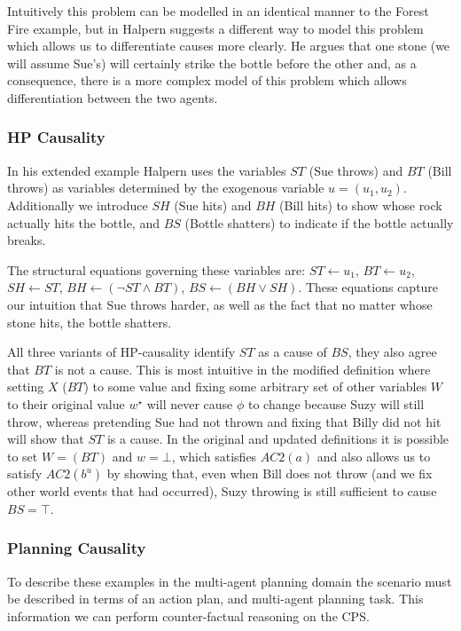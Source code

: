 \documentclass{article}
\theoremstyle{plain}
\theoremstyle{definition}
\begin{document}
Intuitively this problem can be modelled in an identical manner to the Forest Fire example, but in \cite{halpern2005causes} Halpern suggests a different way to model this problem which allows us to differentiate causes more clearly. He argues that one stone (we will assume Sue's) will certainly strike the bottle before the other and, as a consequence, there is a more complex model of this problem which allows differentiation between the two agents.



\subsubsection*{HP Causality}
In his extended example Halpern uses the variables $ST$ (Sue throws) and $BT$ (Bill throws) as variables determined by the exogenous variable $u=(u_1, u_2)$. Additionally we introduce $SH$ (Sue hits) and $BH$ (Bill hits) to show whose rock actually hits the bottle, and $BS$ (Bottle shatters) to indicate if the bottle actually breaks.

The structural equations governing these variables are: $ST\leftarrow u_1$, $BT\leftarrow u_2$, $SH \leftarrow ST$, $BH \leftarrow (\lnot ST \land BT)$, $BS \leftarrow (BH \lor SH)$. These equations capture our intuition that Sue throws harder, as well as the fact that no matter whose stone hits, the bottle shatters.

All three variants of HP-causality identify $ST$ as a cause of $BS$, they also agree that $BT$ is not a cause. This is most intuitive in the modified definition where setting $X$ ($BT$) to some value and fixing some arbitrary set of other variables $W$ to their original value $w^\star$ will never cause $\phi$ to change because Suzy will still throw, whereas pretending Sue had not thrown and fixing that Billy did not hit will show that $ST$ is a cause. In the original and updated definitions it is possible to set $W=(BT)$ and $w=\bot$, which satisfies $AC2(a)$ and also allows us to satisfy $AC2(b^u)$ by showing that, even when Bill does not throw (and we fix other world events that had occurred), Suzy throwing is still sufficient to cause $BS=\top$. 


\subsubsection*{Planning Causality}
To describe these examples in the multi-agent planning domain the scenario must be described in terms of an action plan, and multi-agent planning task. This information we can perform counter-factual reasoning on the CPS.
\end{document}
